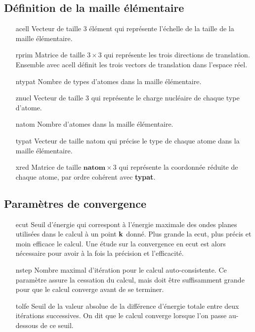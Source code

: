 \subsection{Définition de la maille élémentaire}
\begin{itemize}[labelwidth=, leftmargin=+, font=\bfseries]
  \item[acell] Vecteur de taille 3 élément qui représente l'échelle de la taille de la maille élémentaire.
  \item[rprim] Matrice de taille $3\times 3$ qui représente les trois directions de translation.
    Ensemble avec acell définit les trois vectors de translation dans l'espace réel.
  \item[ntypat] Nombre de types d'atomes dans la maille élémentaire.
  \item[znucl] Vecteur de taille 3 qui représente le charge nucléaire de chaque type d'atome.
  \item[natom] Nombre d'atomes dans la maille élémentaire.
  \item[typat] Vecteur de taille natom qui précise le type de chaque atome dans la maille élémentaire.
  \item[xred] Matrice de taille $\textbf{natom}\times 3$ qui représente la coordonnée réduite de chaque atome,
    par ordre cohérent avec \textbf{typat}.
\end{itemize}
\subsection{Paramètres de convergence}
\begin{itemize}[labelwidth=, leftmargin=+, font=\bfseries]
  \item[ecut] Seuil d'énergie qui correspont à l'énergie maximale des ondes planes utilisées dans le calcul à un point $\vb{k}$ donné.
    Plus grande la ecut, plus précis et moin efficace le calcul.
    Une étude sur la convergence en ecut est alors nécessaire pour avoir à la fois la précision et l'efficacité.
  \item[nstep] Nombre maximal d'itération pour le calcul auto-consistente.
    Ce paramètre assure la cessation du calcul, mais doit être suffisamment grande pour que le calcul converge avant de se terminer.
  \item[tolfe] Seuil de la valeur absolue de la différence d'énergie totale entre deux itérations successives.
    On dit que le calcul converge lorsque l'on passe au-dessous de ce seuil.
\end{itemize}



